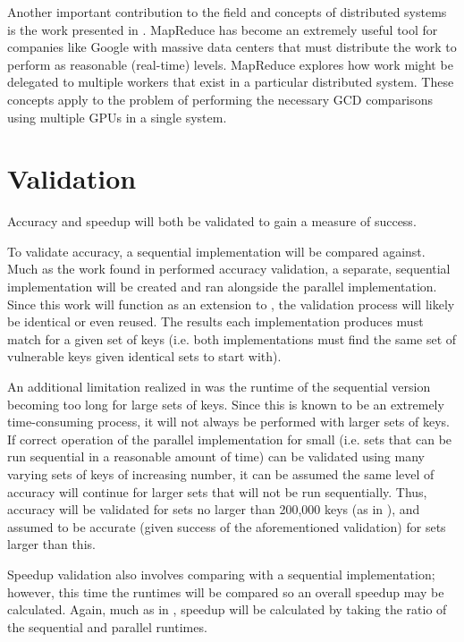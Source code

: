\documentclass[12pt]{ucthesis}
\begin{document}
Another important contribution to the field and concepts of distributed systems
is the work presented in \cite{dean2008mapreduce}. MapReduce has become an
extremely useful tool for companies like Google with massive data centers that
must distribute the work to perform as reasonable (real-time) levels. MapReduce
explores how work might be delegated to multiple workers that exist in a
particular distributed system. These concepts apply to the problem of
performing the necessary GCD comparisons using multiple GPUs in a single
system.


\chapter{Validation}
Accuracy and speedup will both be validated to gain a measure of success.

To validate accuracy, a sequential implementation will be compared against.
Much as the work found in \cite{scharfglass2012breaking} performed accuracy
validation, a separate, sequential implementation will be created and ran
alongside the parallel implementation. Since this work will function as an
extension to \cite{scharfglass2012breaking}, the validation process will likely be
identical or even reused. The results each implementation produces must match
for a given set of keys (i.e. both implementations must find the same set of
vulnerable keys given identical sets to start with).

An additional limitation realized in \cite{scharfglass2012breaking} was the runtime
of the sequential version becoming too long for large sets of keys. Since this
is known to be an extremely time-consuming process, it will not always be
performed with larger sets of keys. If correct operation of the parallel
implementation for small (i.e. sets that can be run sequential in a reasonable
amount of time) can be validated using many varying sets of keys of increasing
number, it can be assumed the same level of accuracy will continue for larger
sets that will not be run sequentially. Thus, accuracy will be validated for
sets no larger than 200,000 keys (as in \cite{scharfglass2012breaking}), and
assumed to be accurate (given success of the aforementioned validation) for
sets larger than this.

Speedup validation also involves comparing with a sequential implementation;
however, this time the runtimes will be compared so an overall speedup may be
calculated. Again, much as in \cite{scharfglass2012breaking}, speedup will be
calculated by taking the ratio of the sequential and parallel runtimes.
\end{document}
